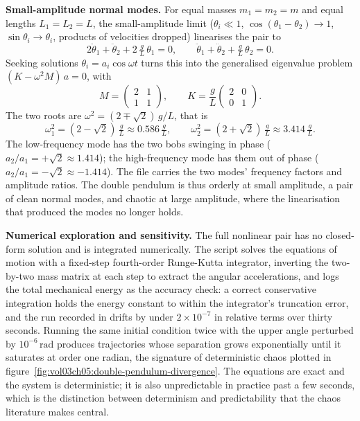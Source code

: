 \textbf{Small-amplitude normal modes.} For equal masses $m_1 = m_2 = m$
and equal lengths $L_1 = L_2 = L$, the small-amplitude limit
($\theta_i \ll 1$, $\cos(\theta_1-\theta_2)\to 1$, $\sin\theta_i\to
\theta_i$, products of velocities dropped) linearises the pair to
\[
2\ddot{\theta}_1 + \ddot{\theta}_2 + 2\,\tfrac{g}{L}\,\theta_1 = 0,
\qquad
\ddot{\theta}_1 + \ddot{\theta}_2 + \tfrac{g}{L}\,\theta_2 = 0.
\]
Seeking solutions $\theta_i = a_i \cos\omega t$ turns this into the
generalised eigenvalue problem $(K - \omega^2 M)\,a = 0$, with
\[
M = \begin{pmatrix} 2 & 1 \\ 1 & 1 \end{pmatrix},
\qquad
K = \frac{g}{L}\begin{pmatrix} 2 & 0 \\ 0 & 1 \end{pmatrix}.
\]
The two roots are $\omega^2 = (2 \mp \sqrt{2})\,g/L$, that is
\[
\omega_1^2 = (2 - \sqrt2)\,\tfrac{g}{L} \approx 0.586\,\tfrac{g}{L},
\qquad
\omega_2^2 = (2 + \sqrt2)\,\tfrac{g}{L} \approx 3.414\,\tfrac{g}{L}.
\]
The low-frequency mode has the two bobs swinging in phase
($a_2/a_1 = +\sqrt2 \approx 1.414$); the high-frequency mode has them
out of phase ($a_2/a_1 = -\sqrt2 \approx -1.414$). The file
 carries the two modes' frequency
factors and amplitude ratios. The double pendulum is thus orderly at
small amplitude, a pair of clean normal modes, and chaotic at large
amplitude, where the linearisation that produced the modes no longer
holds.

\textbf{Numerical exploration and sensitivity.} The full nonlinear pair
has no closed-form solution and is integrated numerically. The
script  solves the equations of motion
with a fixed-step fourth-order Runge-Kutta integrator, inverting the
two-by-two mass matrix at each step to extract the angular
accelerations, and logs the total mechanical energy as the
accuracy check: a correct conservative integration holds the energy
constant to within the integrator's truncation error, and the run
recorded in  drifts by under
$2\times 10^{-7}$ in relative terms over thirty seconds. Running the
same initial condition twice with the upper angle perturbed by
$10^{-6}\,\si{\radian}$ produces trajectories whose separation grows
exponentially until it saturates at order one radian, the signature of
deterministic chaos plotted in
figure~\ref{fig:vol03ch05:double-pendulum-divergence}. The equations
are exact and the system is deterministic; it is also unpredictable in
practice past a few seconds, which is the distinction between
determinism and predictability that the chaos literature makes
central.

